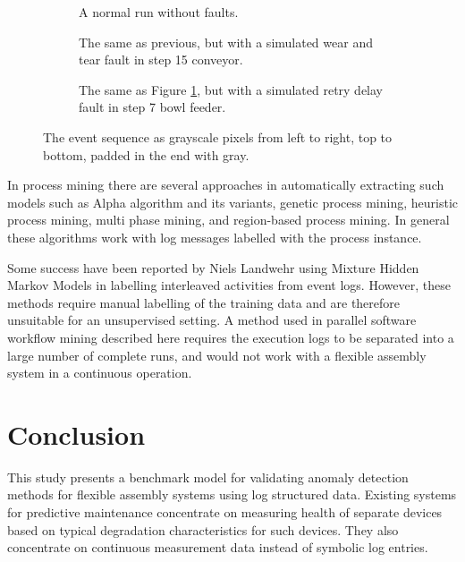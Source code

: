 \documentclass[procedia]{easychair}
\begin{document}
\begin{figure}[tb]
\begin{subfigure}[h]{0.32\linewidth}
 \resizebox{\linewidth}{!}{}
 \caption{A normal run without faults.\newline\newline}
 \label{figure:output_easy}
\end{subfigure}
\begin{subfigure}[h]{0.32\linewidth}
 \resizebox{\linewidth}{!}{}
 \caption{The same as previous, but with a simulated wear and tear fault in step 15 conveyor.}
 \label{figure:output_easy_wear_and_tear}
\end{subfigure}
\begin{subfigure}[h]{0.32\linewidth}
 \resizebox{\linewidth}{!}{}
 \caption{The same as Figure \ref{figure:output_easy}, but with a simulated retry delay fault in step 7 bowl feeder.}
 \label{figure:output_easy_retry_delay}
\end{subfigure}
 \caption{The event sequence as grayscale pixels from left to right, top to bottom, padded in the end with gray.}
 \label{figure:output_images}
\end{figure}

In process mining there are several approaches in automatically extracting such models such as Alpha algorithm and its 
variants, genetic process mining, heuristic process mining, multi phase mining, and region-based process mining. In general these algorithms work with log messages labelled with the process instance.

Some success have been reported by Niels Landwehr using Mixture Hidden Markov Models \cite{landwehr2008modeling} in labelling interleaved activities from event logs.
However, these methods require manual labelling of the training data and are therefore unsuitable for an unsupervised setting.
A method used in parallel software workflow mining described here \cite{mining-program-workflow-from-interleaved-traces} requires the execution logs to be separated into
a large number of complete runs, and would not work with a flexible assembly system in a continuous operation.

\section{Conclusion}

This study presents a benchmark model for validating anomaly detection methods for flexible assembly systems using log structured data.
Existing systems for predictive maintenance concentrate on measuring health of separate devices based on typical degradation characteristics
for such devices. They also concentrate on continuous measurement data instead of symbolic log entries.
\end{document}
